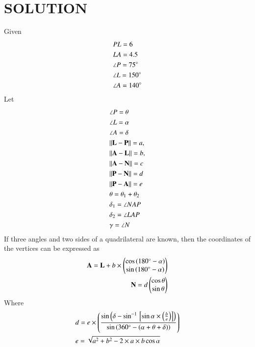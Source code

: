 \documentclass[journal,12pt,twocolumn]{IEEEtran}
\begin{document}
\section{SOLUTION}
\begin{lemma}
Given 
\begin{align}
    &PL = 6\\
    &LA = 4.5\\
    &\angle P = 75 \degree\\
    &\angle L = 150 \degree\\
    &\angle A = 140 \degree
\end{align}
Let
\begin{align}
        &\angle P=\theta \label{eq1}
    \\
    &\angle L=\alpha
    \\
    &\angle A=\delta \label{eq2}
    \\
    &\lVert\mathbf{L}-\mathbf{P}\rVert =a, \label{eq3}
    \\
    &\lVert\mathbf{A}-\mathbf{L}\rVert =b,\label{eq4}
    \\
 &\lVert\mathbf{A}-\mathbf{N}\rVert=c
 \\
  &\lVert\mathbf{P}-\mathbf{N}\rVert =d 
  \\
    &\lVert\mathbf{P}-\mathbf{A}\rVert =e
  \\
  &\theta= \theta_1 + \theta_2
  \\
  & \delta_1=\angle NAP \\
  & \delta_2= \angle LAP\\
  & \gamma= \angle N
\end{align}
If three angles and two sides of a quadrilateral are known, then the coordinates of the vertices can be expressed as
\begin{align}
    \mathbf{A}=\mathbf{L}+b\times \begin{pmatrix}\cos {(180\degree-\alpha)} \\ \sin{(180\degree - \alpha)}\end{pmatrix}\\
    \mathbf{N}=d \begin{pmatrix}\cos \theta \\ \sin \theta\end{pmatrix}
\end{align}
Where
    \begin{align}
    &d=e \times \left(\frac{\sin\left({\delta-\sin^{-1}{}\left[\sin{\alpha}\times \left(\frac{b}{e}\right)\right]}\right)}{\sin\left({360\degree-(\alpha+\theta+\delta)}\right)}\right)\\
   & e=\sqrt{a^2+b^2-2\times a \times b\cos{\alpha}}
\end{align}
\end{lemma}
\end{document}
